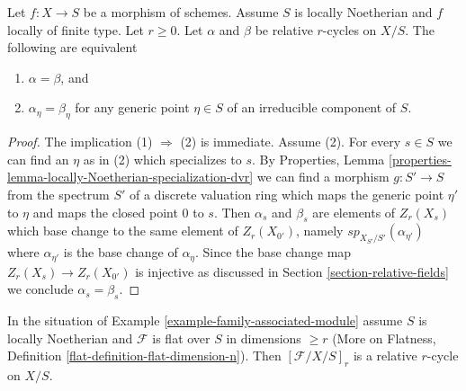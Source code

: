 \begin{lemma}
\label{lemma-uniqueness-extension}
Let $f : X \to S$ be a morphism of schemes. Assume $S$ is locally Noetherian
and $f$ locally of finite type. Let $r \geq 0$. Let $\alpha$ and $\beta$
be relative $r$-cycles on $X/S$. The following are equivalent
\begin{enumerate}
\item $\alpha = \beta$, and
\item $\alpha_\eta = \beta_\eta$ for any generic point $\eta \in S$
of an irreducible component of $S$.
\end{enumerate}
\end{lemma}

\begin{proof}
The implication (1) $\Rightarrow$ (2) is immediate.
Assume (2). For every $s \in S$ we can find an $\eta$ as in (2)
which specializes to $s$. By
Properties, Lemma \ref{properties-lemma-locally-Noetherian-specialization-dvr}
we can find a morphism $g : S' \to S$ from the
spectrum $S'$ of a discrete valuation ring which maps
the generic point $\eta'$ to $\eta$ and maps
the closed point $0$ to $s$. Then $\alpha_s$ and $\beta_s$
are elements of $Z_r(X_s)$ which base change to the same
element of $Z_r(X_{0'})$, namely $sp_{X_{S'}/S'}(\alpha_{\eta'})$
where $\alpha_{\eta'}$ is the base change of $\alpha_\eta$.
Since the base change map $Z_r(X_s) \to Z_r(X_{0'})$ is injective
as discussed in Section \ref{section-relative-fields}
we conclude $\alpha_s = \beta_s$.
\end{proof}

\begin{lemma}
\label{lemma-family-associated-module-specialization}
In the situation of Example \ref{example-family-associated-module}
assume $S$ is locally Noetherian and
$\mathcal{F}$ is flat over $S$ in dimensions $\geq r$
(More on Flatness, Definition \ref{flat-definition-flat-dimension-n}).
Then $[\mathcal{F}/X/S]_r$ is a relative $r$-cycle on $X/S$.
\end{lemma}


